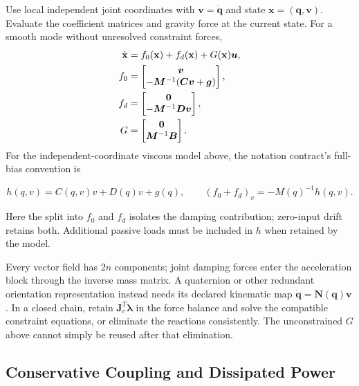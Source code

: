 Use local independent joint coordinates with \(\bm v=\dot{\bm q}\) and state \(\mathbf x=(\bm q,\bm v)\). Evaluate the coefficient matrices and gravity force at the current state. For a smooth mode without unresolved constraint forces, \[
\begin{aligned}
\dot{\mathbf x}&=f_0(\mathbf x)+f_d(\mathbf x)+G(\mathbf x)\bm{u},\\
f_0&=\begin{bmatrix}\bm v\\-\bm M^{-1}(\bm C\bm v+\bm g)\end{bmatrix},\\
f_d&=\begin{bmatrix}\bm 0\\-\bm M^{-1}\bm D\bm v\end{bmatrix},\\
G&=\begin{bmatrix}\bm 0\\\bm M^{-1}\bm B\end{bmatrix}.
\end{aligned}
\] For the independent-coordinate viscous model above, the notation contract's full-bias convention is

\[
h(q,v)=C(q,v)v+D(q)v+g(q),\qquad (f_0+f_d)_v=-M(q)^{-1}h(q,v).
\]

Here the split into \(f_0\) and \(f_d\) isolates the damping contribution; zero-input drift retains both. Additional passive loads must be included in \(h\) when retained by the model.

Every vector field has \(2n\) components; joint damping forces enter the acceleration block through the inverse mass matrix. A quaternion or other redundant orientation representation instead needs its declared kinematic map \(\dot{\bm q}=\bm N(\bm q)\bm v\). In a closed chain, retain \(\bm J_c^T\boldsymbol{\lambda}\) in the force balance and solve the compatible constraint equations, or eliminate the reactions consistently. The unconstrained \(G\) above cannot simply be reused after that elimination.

\subsection{Conservative Coupling and Dissipated Power}\label{sec-damping-energy-ledger}

